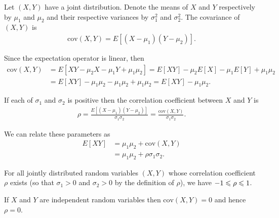 \begin{definition}{}{}
    Let $(X,Y)$ have a joint distribution. Denote the means of $X$ and $Y$
    respectively by $\mu_1$ and $\mu_2$ and their respective variances by $\sigma_1^2$ and $\sigma_2^2$.
    The covariance of $(X,Y)$ is 
    \begin{align*}
        \text{cov}(X,Y) = E[(X-\mu_1)(Y-\mu_2)].
    \end{align*}
\end{definition}

\begin{remark}
    Since the expectation operator is linear, then
    \begin{align*}
        \text{cov}(X,Y) &= E[XY-\mu_2X-\mu_1Y+\mu_1\mu_2] = E[XY] - \mu_2E[X] - \mu_1 E[Y] +\mu_1\mu_2\\
                        &= E[XY] - \mu_1\mu_2-\mu_1\mu_2+\mu_1\mu_2 = E[XY] - \mu_1\mu_2. 
    \end{align*}
\end{remark}

\begin{definition}{}{}
    If each of $\sigma_1$ and $\sigma_2$ is positive then the correlation coefficient between $X$ and $Y$ is 
    \begin{align*}
        \rho = \frac{E[(X-\mu_1)(Y-\mu_2)]}{\sigma_1\sigma_2} = \frac{\text{cov}(X,Y)}{\sigma_1\sigma_2}.
    \end{align*}
\end{definition}

\begin{remark}
    We can relate these parameters as
    \begin{align*}
        E[XY]  &=\mu_1\mu_2 +\text{cov}(X,Y)\\
            &= \mu_1\mu_2 +\rho\sigma_1\sigma_2.
    \end{align*}
\end{remark}

\begin{theorem}{}{}
    For all jointly distributed random variables $(X,Y)$ whose correlation coefficient $\rho$ exists
    (so that $\sigma_1>0$ and $\sigma_2>0$ by the definition of $\rho$), we have $-1\leqslant \rho \leqslant 1$.
\end{theorem}

\begin{theorem}{}{}
    If $X$ and $Y$ are independent random variables then $\text{cov}(X,Y)=0$ and hence $\rho=0$.
\end{theorem}

